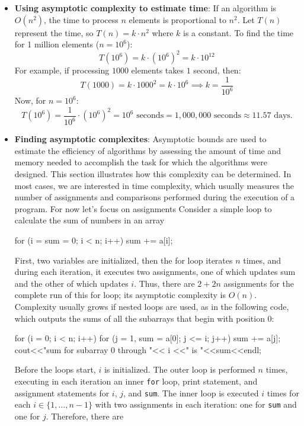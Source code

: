 \documentclass{report}
\begin{document}
\begin{itemize}
\item \textbf{Using asymptotic complexity to estimate time}:
    If an algorithm is $O(n^2)$, the time to process $n$ elements is proportional to $n^2$. 
    \bigbreak \noindent 
    Let $T(n)$ represent the time, so $T(n) = k \cdot n^2$ where $k$ is a constant.
    \bigbreak \noindent 
    To find the time for 1 million elements ($n = 10^6$):
    \[
        T(10^6) = k \cdot (10^6)^2 = k \cdot 10^{12}
    \]
    For example, if processing $1000$ elements takes $1$ second, then:
    \bigbreak \noindent 
    \[
        T(1000) = k \cdot 1000^2 = k \cdot 10^6 \implies k = \frac{1}{10^6}
    \]
    Now, for $n = 10^6$:
    \[
        T(10^6) = \frac{1}{10^6} \cdot (10^6)^2 = 10^6 \text{ seconds} = 1,000,000 \text{ seconds} \approx 11.57 \text{ days}.
    \]
\item \textbf{Finding asymptotic complexites}: Asymptotic bounds are used to estimate the efficiency of algorithms by assessing the
amount of time and memory needed to accomplish the task for which the algorithms
were designed. This section illustrates how this complexity can be determined.
In most cases, we are interested in time complexity, which usually measures the
number of assignments and comparisons performed during the execution of a program. For now let's focus on assignments
\bigbreak \noindent 
Consider a simple loop to calculate the sum of numbers in an array
\bigbreak \noindent 
\begin{cppcode}
    for (i = sum = 0; i < n; i++)
        sum += a[i];
\end{cppcode}
\bigbreak \noindent 
First, two variables are initialized, then the for loop iterates $n$ times, and during each iteration, it executes two assignments, one of which updates sum and the other of which updates $i$. Thus, there are $2 + 2n$ assignments for the complete run of this for loop; its asymptotic complexity is $O(n)$.
\bigbreak \noindent 
Complexity usually grows if nested loops are used, as in the following code, which outputs the sums of all the subarrays that begin with position 0:
\bigbreak \noindent 
\begin{cppcode}
    for (i = 0; i < n; i++) {
        for (j = 1, sum = a[0]; j <= i; j++)
            sum += a[j];
        cout<<"sum for subarray 0 through "<< i <<" is "<<sum<<endl;
    }
\end{cppcode}
\bigbreak \noindent 
Before the loops start, $i$ is initialized. The outer loop is performed $n$ times, executing in each iteration an inner \texttt{for} loop, print statement, and assignment statements for $i$, $j$, and \texttt{sum}. The inner loop is executed $i$ times for each $i \in \{1, \ldots, n-1\}$ with two assignments in each iteration: one for \texttt{sum} and one for $j$. Therefore, there are

\end{itemize}
\end{document}
